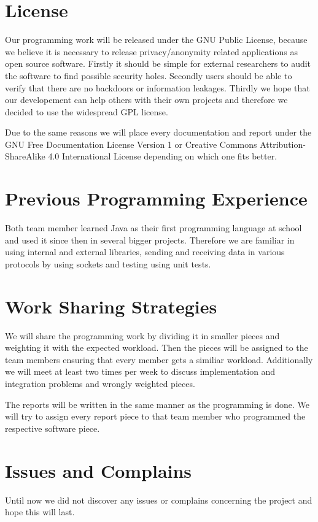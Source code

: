\documentclass{article}
\begin{document}
\section{License}
Our programming work will be released under the GNU Public License, because we
believe it is necessary to release privacy/anonymity related applications as
open source software. Firstly it should be simple for external researchers to
audit the software to find possible security holes. Secondly users should be
able to verify that there are no backdoors or information leakages. Thirdly we
hope that our developement can help others with their own projects and
therefore we decided to use the widespread GPL license.

Due to the same reasons we will place every documentation and report under the
GNU Free Documentation License Version 1 or Creative Commons
Attribution-ShareAlike 4.0 International License depending on which one fits
better.

\section{Previous Programming Experience} 
Both team member learned Java as their first programming language at school and
used it since then in several bigger projects. Therefore we are familiar in
using internal and external libraries, sending and receiving data in various
protocols by using sockets and testing using unit tests.

\section{Work Sharing Strategies}
We will share the programming work by dividing it in smaller pieces and
weighting it with the expected workload. Then the pieces will be assigned to
the team members ensuring that every member gets a similiar workload.
Additionally we will meet at least two times per week to discuss implementation
and integration problems and wrongly weighted pieces.

The reports will be written in the same manner as the programming is done. We
will try to assign every report piece to that team member who programmed the
respective software piece.

\section{Issues and Complains}
Until now we did not discover any issues or complains concerning the project
and hope this will last.
\end{document}
